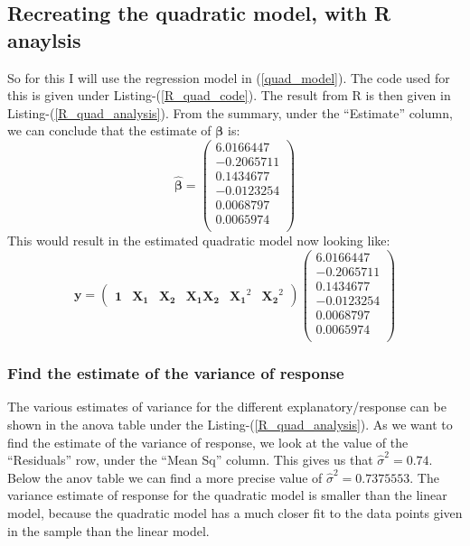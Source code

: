 \documentclass[12pt]{article}
\newcommand{\vect}[1]{\boldsymbol{#1}}
\newcommand{\est}[1]{\hat{#1}}
\begin{document}
\subsection{Recreating the quadratic model, with R anaylsis}
So for this I will use the regression model in (\ref{quad_model}). The code used for this is given under Listing-(\ref{R_quad_code}). The result from R is then given in Listing-(\ref{R_quad_analysis}). From the summary, under the \enquote{Estimate} column, we can conclude that the estimate of $\vect{\beta}$ is:
\begin{equation} \label{R_quad_beta}
  \est{\vect{\beta}} =
  \begin{pmatrix}
     6.0166447  \\
    -0.2065711  \\
     0.1434677  \\
    -0.0123254  \\
     0.0068797  \\
     0.0065974  \\
  \end{pmatrix}
\end{equation}
This would result in the estimated quadratic model now looking like:
\begin{equation*}
\vect{y} = \begin{pmatrix}
              \vect{1} & \vect{X_1} & \vect{X_2} & \vect{X_1}\vect{X_2} & \vect{X_1}^2 & \vect{X_2}^2
           \end{pmatrix}
           \begin{pmatrix}
             6.0166447  \\
            -0.2065711  \\
             0.1434677  \\
            -0.0123254  \\
             0.0068797  \\
             0.0065974  \\
           \end{pmatrix}
\end{equation*}


\subsubsection{Find the estimate of the variance of response}
The various estimates of variance for the different explanatory/response can be shown in the anova table under the Listing-(\ref{R_quad_analysis}). As we want to find the estimate of the variance of response, we look at the value of the \enquote{Residuals} row, under the \enquote{Mean Sq} column. This gives us that $\est{\sigma}^2 = 0.74$. Below the anov table we can find a more precise value of $\est{\sigma}^2 = 0.7375553$. The variance estimate of response for the quadratic model is smaller than the linear model, because the quadratic model has a much closer fit to the data points given in the sample than the linear model.
\end{document}
